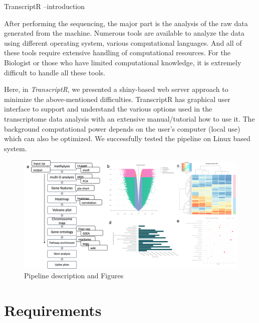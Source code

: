 \documentclass[
  a4paper,
  DIV=11,
  numbers=noendperiod,
  oneside,
  open=any]{scrreport}
\begin{document}
TranscriptR --introduction

After performing the sequencing, the major part is the analysis of the
raw data generated from the machine. Numerous tools are available to
analyze the data using different operating system, various computational
languages. And all of these tools require extensive handling of
computational resources. For the Biologist or those who have limited
computational knowledge, it is extremely difficult to handle all these
tools.

Here, in \emph{TranscriptR}, we presented a shiny-based web server
approach to minimize the above-mentioned difficulties. TranscriptR has
graphical user interface to support and understand the various options
used in the transcriptome data analysis with an extensive
manual/tutorial how to use it. The background computational power
depends on the user's computer (local use) which can also be optimized.
We successfully tested the pipeline on Linux based system.\\

\begin{figure}[H]

{\centering \includegraphics{images/Figure1.png}

}

\caption{Pipeline description and Figures}

\end{figure}%

\section*{Requirements}\label{requirements}

\end{document}
